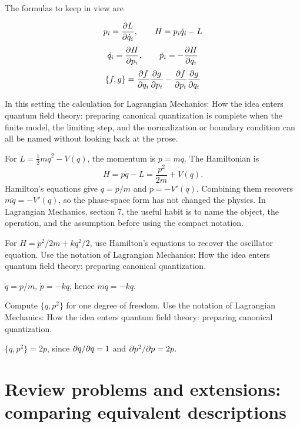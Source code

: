 The formulas to keep in view are

\[
  p_i=\frac{\partial L}{\partial\dot q_i},\qquad H=p_i\dot q_i-L
\]
\[
  \dot q_i=\frac{\partial H}{\partial p_i},\qquad \dot p_i=-\frac{\partial H}{\partial q_i}
\]
\[
  \{f,g\}=\frac{\partial f}{\partial q_i}\frac{\partial g}{\partial p_i}-\frac{\partial f}{\partial p_i}\frac{\partial g}{\partial q_i}
\]

In this setting the calculation for Lagrangian Mechanics: How the idea enters quantum field theory: preparing canonical quantization is complete when the finite model, the limiting step, and the normalization or boundary condition can all be named without looking back at the prose.




\begin{example}
For \(L=\frac12m\dot q^2-V(q)\), the momentum is \(p=m\dot q\).  The Hamiltonian is
\[
  H=p\dot q-L=\frac{p^2}{2m}+V(q).
\]
Hamilton's equations give \(\dot q=p/m\) and \(\dot p=-V'(q)\).  Combining them recovers \(m\ddot q=-V'(q)\), so the phase-space form has not changed the physics.  In Lagrangian Mechanics, section 7, the useful habit is to name the object, the operation, and the assumption before using the compact notation.
\end{example}



\begin{exercise}
For \(H=p^2/2m+kq^2/2\), use Hamilton's equations to recover the oscillator equation.  Use the notation of Lagrangian Mechanics: How the idea enters quantum field theory: preparing canonical quantization.
\begin{answer}
\(\dot q=p/m\), \(\dot p=-kq\), hence \(m\ddot q=-kq\).
\end{answer}
\end{exercise}

\begin{exercise}
Compute \(\{q,p^2\}\) for one degree of freedom.  Use the notation of Lagrangian Mechanics: How the idea enters quantum field theory: preparing canonical quantization.
\begin{answer}
\(\{q,p^2\}=2p\), since \(\partial q/\partial q=1\) and \(\partial p^2/\partial p=2p\).
\end{answer}
\end{exercise}



\section{Review problems and extensions: comparing equivalent descriptions}

